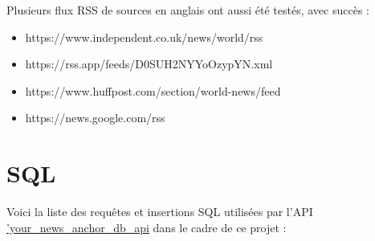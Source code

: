 \documentclass[french]{article}
\begin{document}
    Plusieurs flux RSS de sources en anglais ont aussi été testés, avec succès :
    \begin{itemize}
        \item https://www.independent.co.uk/news/world/rss
        \item https://rss.app/feeds/D0SUH2NYYoOzypYN.xml
        \item https://www.huffpost.com/section/world-news/feed
        \item https://news.google.com/rss
    \end{itemize}
    \section*{SQL}
    Voici la liste des requêtes et insertions SQL utilisées par l'API \href{}{'your\_news\_anchor\_db\_api} dans le cadre de ce projet :
\end{document}
